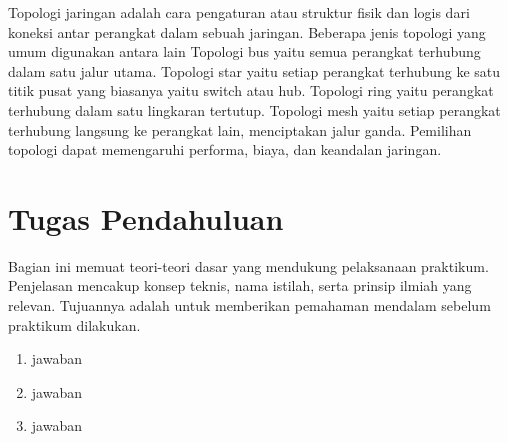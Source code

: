 Topologi jaringan adalah cara pengaturan atau struktur fisik dan logis dari koneksi antar perangkat dalam sebuah jaringan. Beberapa jenis topologi yang umum digunakan antara lain Topologi bus yaitu semua perangkat terhubung dalam satu jalur utama. Topologi star yaitu setiap perangkat terhubung ke satu titik pusat yang biasanya yaitu switch atau hub. Topologi ring yaitu perangkat terhubung dalam satu lingkaran tertutup. Topologi mesh yaitu setiap perangkat terhubung langsung ke perangkat lain, menciptakan jalur ganda.
Pemilihan topologi dapat memengaruhi performa, biaya, dan keandalan jaringan.

\section{Tugas Pendahuluan}
Bagian ini memuat teori-teori dasar yang mendukung pelaksanaan praktikum. Penjelasan mencakup konsep teknis, nama istilah, serta prinsip ilmiah yang relevan. Tujuannya adalah untuk memberikan pemahaman mendalam sebelum praktikum dilakukan.
\begin{enumerate}
	\item jawaban
	\item jawaban
	\item jawaban
\end{enumerate}